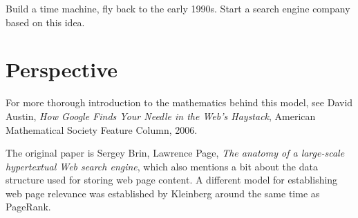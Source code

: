 \documentclass{tufte-handout}
\begin{document}
Build a time machine, fly back to the early 1990s.
Start a search engine company based on this idea.


\section{Perspective}

For more thorough introduction to the mathematics
  behind this model, see David Austin, \emph{How Google Finds Your Needle in
  the Web's Haystack}, American Mathematical Society Feature Column,
  2006.

The original paper is Sergey Brin, Lawrence Page, \emph{The anatomy of a
large-scale hypertextual Web search engine}, which also mentions a
bit about the data structure used for storing web page content.
A different model for establishing web page relevance was established
by Kleinberg around the same time as PageRank.
\end{document}
